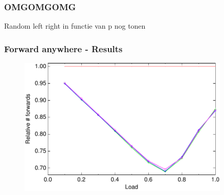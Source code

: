 \documentclass[compress]{beamer}
\begin{document}
\begin{frame}
\frametitle{OMGOMGOMG}
Random left right in functie van p nog tonen
\end{frame}

\begin{frame}
\frametitle{Forward anywhere - Results}
\begin{figure}[h!tb]
 \includegraphics[width=0.9\textwidth]{../data/anywhere.pdf}
 \end{figure}
\end{frame}
\end{document}
